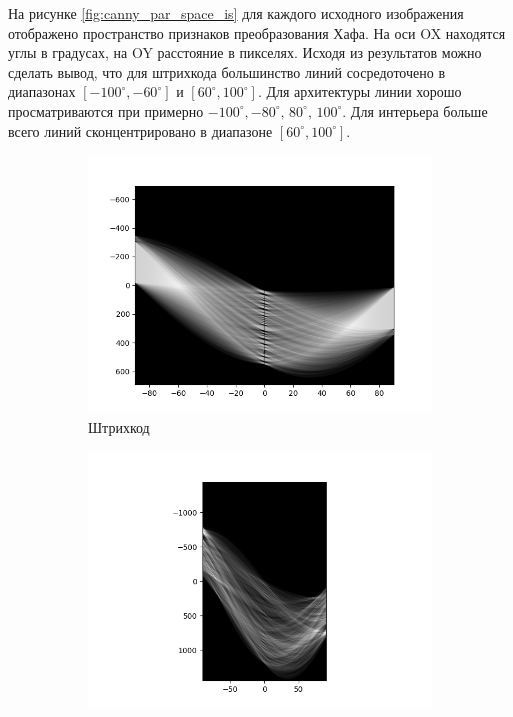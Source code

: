 \documentclass[a4paper, 16pt]{article}
\begin{document}
    \noindent На рисунке \ref{fig:canny_par_space_is} для каждого исходного изображения отображено пространство признаков преобразования Хафа.
    На оси OX находятся углы в градусах, на OY расстояние в пикселях.
    Исходя из результатов можно сделать вывод, что для штрихкода большинство линий сосредоточено в диапазонах
    $[-100^{\circ},-60^{\circ}]$ и $[60^{\circ},100^{\circ}]$. Для архитектуры линии хорошо просматриваются при примерно
    $-100^{\circ},-80^{\circ},\,80^{\circ},\,100^{\circ}$. Для интерьера больше всего линий сконцентрировано в диапазоне
    $[60^{\circ},100^{\circ}]$.


    \newpage
    \begin{figure}[htbp]
        \centering
        \begin{subfigure}{0.3\textwidth}
            \centering
            \includegraphics[width=\linewidth]{canny_par_space_i1.png}
            \caption{Штрихкод}
            \label{fig:canny_par_space_i1}
        \end{subfigure}
        \hfill
        \begin{subfigure}{0.3\textwidth}
            \centering
            \includegraphics[width=\linewidth]{canny_par_space_i2.png}

\end{subfigure}
\end{figure}
\end{document}
